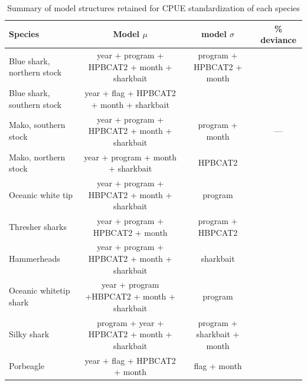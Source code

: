 \documentclass[12pt]{SCreport}
\begin{document}
\begin{landscape}
\begin{table}[!h]
\begin{center}
\begin{tabular}{l|c|c|c|c|c|c|c|c}
 
\end{tabular}
\end{center}
\end{table}
\begin{table}[!h]
\caption{Summary of model structures retained for CPUE standardization of each species}
\begin{center}
\begin{tabular}{l|c|c|c}
Species & Model $\mu$& model $\sigma$ & \% deviance\\
\hline
\hline
Blue shark, northern stock  & year + program + HPBCAT2 + month + sharkbait & program + HPBCAT2 + month&\\
Blue shark, southern stock & year + flag + HPBCAT2 + month + sharkbait & \\ 
Mako, southern stock & year + program + HPBCAT2 + month + sharkbait & program + month & ---\\
Mako, northern stock & year + program + month + sharkbait & HPBCAT2 \\
Oceanic white tip & year + program + HBPCAT2 + month + sharkbait & program \\
Thresher sharks& year + program + HPBCAT2 + month & program + HBPCAT2 \\
Hammerheads& year + program + HPBCAT2 + month + sharkbait & sharkbait \\
Oceanic whitetip shark& year + program +HBPCAT2 + month + sharkbait & program\\
Silky shark & program + year + HPBCAT2 + month + sharkbait & program + sharkbait + month\\
Porbeagle & year + flag + HPBCAT2 + month & flag + month\\ 

\end{tabular}
\end{center}
\end{table}




 

\end{landscape}
\end{document}
